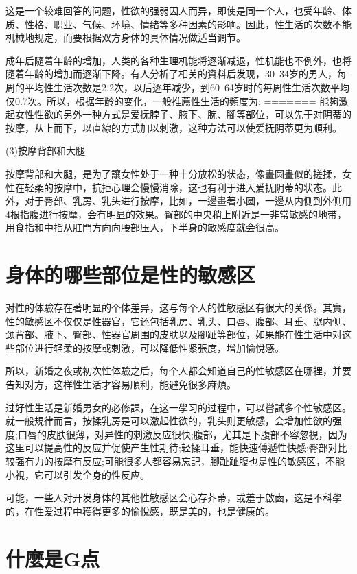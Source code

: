 \documentclass[12pt,UTF8]{ctexbook}
\begin{document}
这是一个较难回答的问题，性欲的强弱因人而异，即使是同一个人，也受年龄、体质、性格、职业、气候、环境、情绪等多种因素的影响。因此，性生活的次数不能机械地规定，而要根据双方身体的具体情况做适当调节。

成年后隨着年龄的增加，人类的各种生理机能将逐渐减退，性机能也不例外，也将隨着年龄的增加而逐渐下降。有人分析了相关的資料后发现，30~34岁的男人，每周的平均性生活次数是2.2次，以后逐年减少，到60~64岁时的每周性生活次数平均仅0.7次。所以，根据年龄的变化，一般推薦性生活的頻度为:
=======
能夠激起女性性欲的另外一种方式是爱抚脖子、腋下、腕、腳等部位，可以先于对阴蒂的按摩，从上而下，以直線的方式加以刺激，这种方法可以使爱抚阴蒂更为順利。

(3)按摩背部和大腿

按摩背部和大腿，是为了讓女性处于一种十分放松的状态，像畫圆畫似的搓揉，女性在轻柔的按摩中，抗拒心理会慢慢消除，这也有利于进入爱抚阴蒂的状态。此外，对于臀部、乳房、乳头进行按摩，比如，一邊畫著小圆，一邊从内侧到外侧用4根指腹进行按摩，会有明显的效果。臀部的中央稍上附近是一非常敏感的地带，用食指和中指从肛門方向向腰部压入，下半身的敏感度就会很高。

\section{身体的哪些部位是性的敏感区}

对性的体驗存在著明显的个体差异，这与每个人的性敏感区有很大的关係。其實，性的敏感区不仅仅是性器官，它还包括乳房、乳头、口唇、腹部、耳垂、腿内侧、颈背部、腋下、臀部、性器官周围的皮肤以及腳趾等部位，如果能在性生活中对这些部位进行轻柔的按摩或刺激，可以降低性紧張度，增加愉悅感。

所以，新婚之夜或初次性体驗之后，每个人都会知道自己的性敏感区在哪裡，并要告知对方，这样性生活才容易順利，能避免很多麻煩。

过好性生活是新婚男女的必修課，在这一學习的过程中，可以嘗試多个性敏感区。就一般規律而言，按揉乳房是可以激起性欲的，乳头则更敏感，会增加性欲的强度;口唇的皮肤很薄，对异性的刺激反应很快;腹部，尤其是下腹部不容忽視，因为这里可以提高性的反应并促使产生性期待;轻揉耳垂，能快速傅遞性快感;臀部对比较强有力的按摩有反应;可能很多人都容易忘記，腳趾趾腹也是性的敏感区，不能小視，它可以引发全身的性反应。

可能，一些人对开发身体的其他性敏感区会心存芥蒂，或羞于啟齒，这是不科學的，在性爱过程中獲得更多的愉悅感，既是美的，也是健康的。

\section{什麼是G点}
\end{document}
